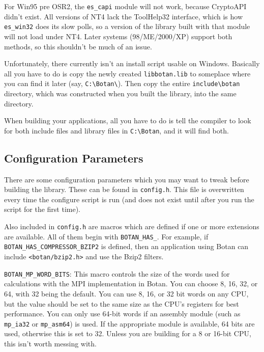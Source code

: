 \documentclass{article}
\newcommand{\filename}[1]{\texttt{#1}}
\newcommand{\module}[1]{\texttt{#1}}
\newcommand{\macro}[1]{\texttt{#1}}
\begin{document}
For Win95 pre OSR2, the \verb|es_capi| module will not work, because
CryptoAPI didn't exist. All versions of NT4 lack the ToolHelp32
interface, which is how \verb|es_win32| does its slow polls, so a
version of the library built with that module will not load under
NT4. Later systems (98/ME/2000/XP) support both methods, so this
shouldn't be much of an issue.

Unfortunately, there currently isn't an install script usable on
Windows. Basically all you have to do is copy the newly created
\filename{libbotan.lib} to someplace where you can find it later (say,
\verb|C:\Botan\|). Then copy the entire \verb|include\botan| directory, which
was constructed when you built the library, into the same directory.

When building your applications, all you have to do is tell the compiler to
look for both include files and library files in \verb|C:\Botan|, and it will
find both.

\pagebreak

\subsection{Configuration Parameters}

There are some configuration parameters which you may want to tweak before
building the library. These can be found in \filename{config.h}. This file is
overwritten every time the configure script is run (and does not exist until
after you run the script for the first time).

Also included in \filename{config.h} are macros which are defined if one or
more extensions are available. All of them begin with \verb|BOTAN_HAS_|. For
example, if \verb|BOTAN_HAS_COMPRESSOR_BZIP2| is defined, then an application
using Botan can include \filename{<botan/bzip2.h>} and use the Bzip2 filters.

\macro{BOTAN\_MP\_WORD\_BITS}: This macro controls the size of the
words used for calculations with the MPI implementation in Botan. You
can choose 8, 16, 32, or 64, with 32 being the default. You can use 8,
16, or 32 bit words on any CPU, but the value should be set to the
same size as the CPU's registers for best performance. You can only
use 64-bit words if an assembly module (such as \module{mp\_ia32} or
\module{mp\_asm64}) is used. If the appropriate module is available,
64 bits are used, otherwise this is set to 32. Unless you are building
for a 8 or 16-bit CPU, this isn't worth messing with.
\end{document}
